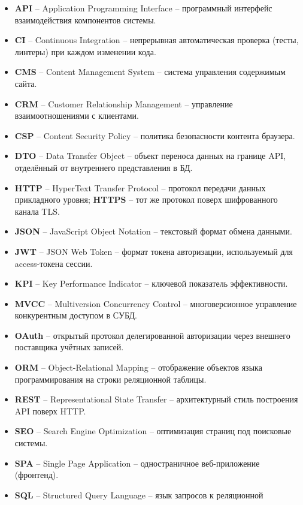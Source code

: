 \begin{itemize}[leftmargin=0pt, itemindent=1.5cm, labelsep=0pt, label={}]
\item \textbf{API} -- Application Programming Interface -- программный интерфейс
  взаимодействия компонентов системы.
\item \textbf{CI} -- Continuous Integration -- непрерывная автоматическая проверка
  (тесты, линтеры) при каждом изменении кода.
\item \textbf{CMS} -- Content Management System -- система управления содержимым сайта.
\item \textbf{CRM} -- Customer Relationship Management -- управление
  взаимоотношениями с клиентами.
\item \textbf{CSP} -- Content Security Policy -- политика безопасности контента
  браузера.
\item \textbf{DTO} -- Data Transfer Object -- объект переноса данных на границе API,
  отделённый от внутреннего представления в БД.
\item \textbf{HTTP} -- HyperText Transfer Protocol -- протокол передачи данных
  прикладного уровня; \textbf{HTTPS} -- тот же протокол поверх шифрованного
  канала TLS.
\item \textbf{JSON} -- JavaScript Object Notation -- текстовый формат обмена
  данными.
\item \textbf{JWT} -- JSON Web Token -- формат токена авторизации, используемый для
  access-токена сессии.
\item \textbf{KPI} -- Key Performance Indicator -- ключевой показатель
  эффективности.
\item \textbf{MVCC} -- Multiversion Concurrency Control -- многоверсионное
  управление конкурентным доступом в СУБД.
\item \textbf{OAuth} -- открытый протокол делегированной авторизации через
  внешнего поставщика учётных записей.
\item \textbf{ORM} -- Object-Relational Mapping -- отображение объектов языка
  программирования на строки реляционной таблицы.
\item \textbf{REST} -- Representational State Transfer -- архитектурный стиль
  построения API поверх HTTP.
\item \textbf{SEO} -- Search Engine Optimization -- оптимизация страниц под
  поисковые системы.
\item \textbf{SPA} -- Single Page Application -- одностраничное веб-приложение
  (фронтенд).
\item \textbf{SQL} -- Structured Query Language -- язык запросов к реляционной

\end{itemize}
